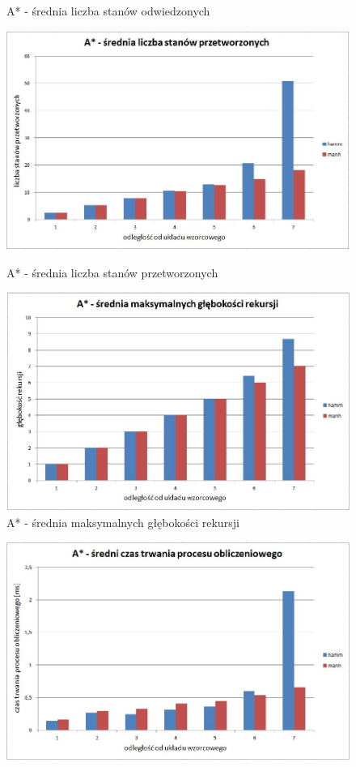 \documentclass{classrep}
\begin{document}
{\begin{figure}[ht!]
\begin{center}
		\caption{A* - średnia liczba stanów odwiedzonych}
	\end{center}
\end{figure}
\newpage
\begin{figure}[ht!]
	\begin{center}
		\vspace{0.3in}
		\includegraphics[scale=0.6]{astr3}
		\caption{A* - średnia liczba stanów przetworzonych}
		\vspace{0.5in}
		\includegraphics[scale=0.6]{astr4}
		\caption{A* - średnia maksymalnych głębokości rekursji}
	\end{center}
\end{figure}
\newpage
\begin{figure}[ht!]
	\begin{center}
		\vspace{0.3in}
		\includegraphics[scale=0.6]{astr5}

\end{center}
\end{figure}}
\end{document}
